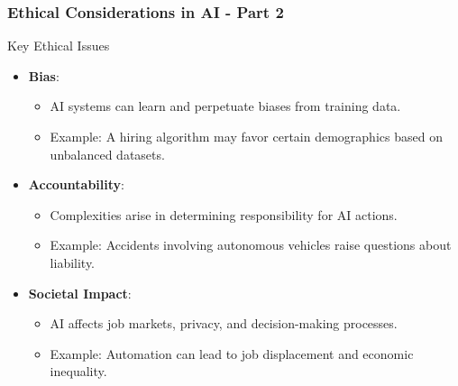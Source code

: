 \documentclass{beamer}
\begin{document}
\begin{frame}[fragile]
    \frametitle{Ethical Considerations in AI - Part 2}
    \begin{block}{Key Ethical Issues}
        \begin{itemize}
            \item \textbf{Bias}:
            \begin{itemize}
                \item AI systems can learn and perpetuate biases from training data.
                \item Example: A hiring algorithm may favor certain demographics based on unbalanced datasets.
            \end{itemize}
            
            \item \textbf{Accountability}:
            \begin{itemize}
                \item Complexities arise in determining responsibility for AI actions.
                \item Example: Accidents involving autonomous vehicles raise questions about liability.
            \end{itemize}
            
            \item \textbf{Societal Impact}:
            \begin{itemize}
                \item AI affects job markets, privacy, and decision-making processes.
                \item Example: Automation can lead to job displacement and economic inequality.
            \end{itemize}
        \end{itemize}
    \end{block}
\end{frame}
\end{document}
